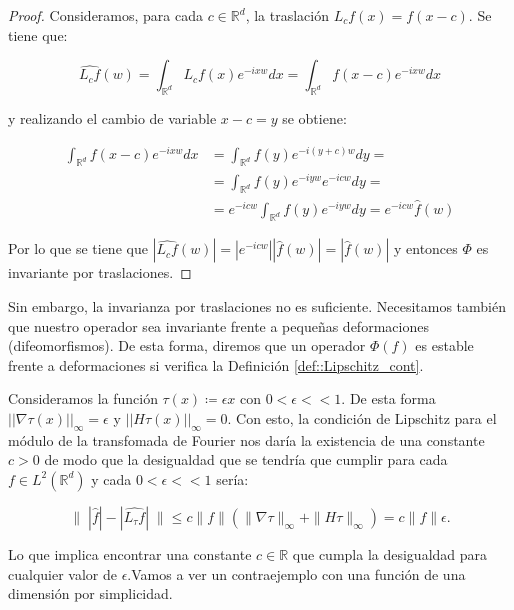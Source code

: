\begin{proof}
    \noindent Consideramos, para cada $c \in \mathbb{R}^d$, la traslación $L_cf(x)=f(x-c)$. Se tiene que:  
    
    $$\widehat{L_cf}(w)=\int_{\mathbb{R}^d}{L_cf(x) e^{-ixw} dx}=\int_{\mathbb{R}^d}{f(x-c)e^{-ixw}dx}$$
    
    \noindent y realizando el cambio de variable $x-c=y$ se obtiene: 
    
    \begin{align*}
        \int_{\mathbb{R}^d}{f(x-c)e^{-ixw}dx} &= \int_{\mathbb{R}^d}{f(y)e^{-i(y+c)w}dy}= \\      &=\int_{\mathbb{R}^d}{f(y)e^{-iyw}e^{-icw}dy}= \\ &=e^{-icw}\int_{\mathbb{R}^d}{f(y)e^{-iyw}dy}=e^{-icw}\widehat{f}(w)
    \end{align*}
    
    \noindent Por lo que se tiene que $|\widehat{L_cf}(w)|=|e^{-icw}| |\widehat{f}(w)|=|\widehat{f}(w)|$ y entonces $\Phi$ es invariante por traslaciones. \qedhere
\end{proof}

\medskip
    
\noindent Sin embargo, la invarianza por traslaciones no es suficiente. Necesitamos también que nuestro operador sea invariante frente a pequeñas deformaciones (difeomorfismos). De esta forma, diremos que un operador $\Phi(f)$ es estable frente a deformaciones si verifica la Definición \ref{def::Lipschitz_cont}.

\noindent Consideramos la función $\tau(x)\coloneqq \epsilon x$ con $0 < \epsilon << 1$. De esta forma $||\nabla \tau (x) ||_\infty = \epsilon$ y $||H\tau(x)||_\infty=0$. Con esto, la condición de Lipschitz para el módulo de la transfomada de Fourier nos daría la existencia de una constante $c>0$ de modo que la desigualdad que se tendría que cumplir para cada $f \in L^2(\mathbb{R}^d)$ y cada $0 < \epsilon << 1$ sería:


  \begin{equation} \label{eq::lipschitz_condition}
    \|\;|\widehat{f}| -|\widehat{L_\tau f}| \; \| \leq c \|f\| (\|\nabla \tau \|_{\infty} + \|H\tau\|_\infty) = c \|f\| \epsilon.
  \end{equation}

  \noindent Lo que implica encontrar una constante $c\in \mathbb{R}$ que cumpla la desigualdad para cualquier valor de $\epsilon$.Vamos a ver un contraejemplo con una función de una dimensión por simplicidad.

